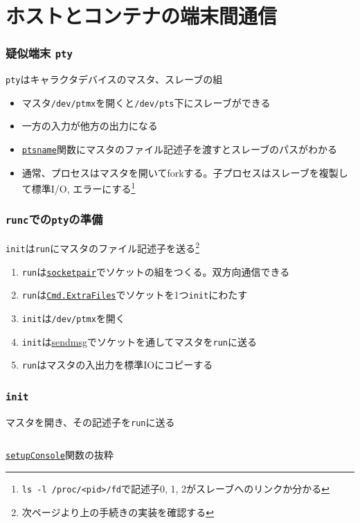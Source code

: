 \documentclass[unicode, 14pt, aspectratio=169]{beamer}
\begin{document}
\section{ホストとコンテナの端末間通信}
\begin{frame}[t]
  \frametitle{疑似端末 \texttt{pty}}
  \large
  \texttt{pty}はキャラクタデバイスのマスタ、スレーブの組\supercite{pty}
  \normalsize
  \begin{itemize}[leftmargin=0.8cm,label=$\circ$]
  \item マスタ\texttt{/dev/ptmx}を開くと\texttt{/dev/pts}下にスレーブができる
  \item 一方の入力が他方の出力になる
  \item \href{https://man7.org/linux/man-pages/man3/ptsname.3.html}{\texttt{ptsname}}関数にマスタのファイル記述子を渡すとスレーブのパスがわかる
  \item 通常、プロセスはマスタを開いてforkする。子プロセスはスレーブを複製して標準I/O, エラーにする\supercite{advancedunix}\footnote{\texttt{ls -l /proc/<pid>/fd}で記述子0, 1, 2がスレーブへのリンクか分かる}
  \end{itemize}
\end{frame}
\begin{frame}[t]
  \frametitle{\texttt{runc}での\texttt{pty}の準備}
  \large
  \texttt{init}は\texttt{run}にマスタのファイル記述子を送る\footnote{\scriptsize{次ページより上の手続きの実装を確認する}}
  \normalsize
  \begin{enumerate}[leftmargin=1.2cm]
  \item \texttt{run}は\href{https://man7.org/linux/man-pages/man2/socketpair.2.html}{\texttt{socketpair}}でソケットの組をつくる。双方向通信できる
  \item \texttt{run}は\href{https://pkg.go.dev/os/exec\#Cmd}{\texttt{Cmd.ExtraFiles}}でソケットを1つ\texttt{init}にわたす
  \item \texttt{init}は\texttt{/dev/ptmx}を開く
  \item \texttt{init}は\href{https://man7.org/linux/man-pages/man3/sendmsg.3p.html}{sendmsg}でソケットを通してマスタを\texttt{run}に送る
  \item \texttt{run}はマスタの入出力を標準IOにコピーする
  \end{enumerate}
\end{frame}
\begin{frame}[t]
  \frametitle{\texttt{init}}
  \large
  マスタを開き、その記述子を\texttt{run}に送る
  \normalsize
  \begin{center}
    \inputminted{go}{code/tty_init.go}
    \href{https://github.com/opencontainers/runc/blob/7cb363254b69e10320360b63fb73e0ffb5da7bf2/libcontainer/init_linux.go\#L371}{\texttt{setupConsole}}関数の抜粋
  \end{center}
\end{frame}
\end{document}
